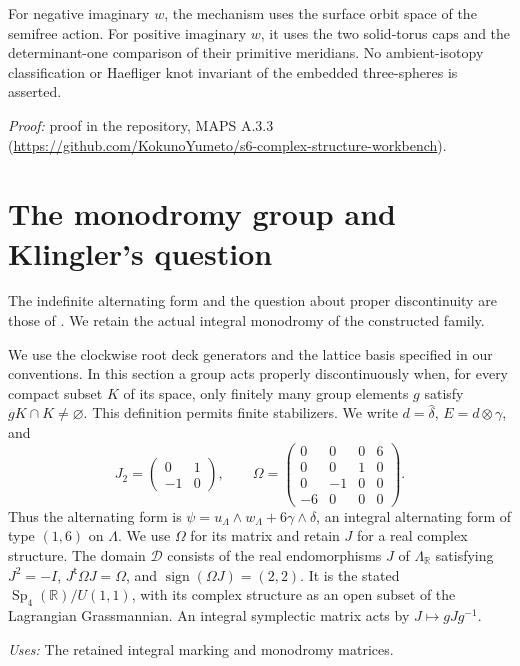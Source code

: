 For negative imaginary $w$, the mechanism uses the surface orbit space of the semifree action. For positive imaginary $w$, it uses the two solid-torus caps and the determinant-one comparison of their primitive meridians. No ambient-isotopy classification or Haefliger knot invariant of the embedded three-spheres is asserted.

\noindent\emph{Proof:} proof in the repository, MAPS A.3.3 (\url{https://github.com/KokunoYumeto/s6-complex-structure-workbench}).

\section{The monodromy group and Klingler's question}
\label{sec:monodromy}
The indefinite alternating form and the question about proper discontinuity
are those of \cite[Remark~8.4]{E26}. We retain the actual integral
monodromy of the constructed family.
\begin{definition}\label{fam:F.setup}
We use the clockwise root deck generators and the lattice basis specified
in our conventions.  In this section a group acts properly discontinuously when, for every
compact subset $K$ of its space, only finitely many group elements $g$ satisfy
$gK\cap K\ne\varnothing$.  This definition permits finite stabilizers.  We
write $d=\widehat\delta$, $E=d\otimes\gamma$, and
\[
 J_2=\begin{pmatrix}0&1\\-1&0\end{pmatrix},\qquad
 \Omega=\begin{pmatrix}
 0&0&0&6\\0&0&1&0\\0&-1&0&0\\-6&0&0&0
 \end{pmatrix}.
\]
Thus the alternating form is
$\psi=u_{\Lambda}\wedge w_{\Lambda}+6\gamma\wedge\delta$, an integral alternating form of
type $(1,6)$ on $\Lambda$.  We use $\Omega$ for its matrix and retain $J$ for
a real complex structure.  The domain $\mathcal D$ consists of the real
endomorphisms $J$ of $\Lambda_{\mathbb R}$ satisfying
$J^2=-I$, $J^{\mathsf t}\Omega J=\Omega$, and
$\operatorname{sign}(\Omega J)=(2,2)$.  It is the stated
$\operatorname{Sp}_4(\mathbb R)/U(1,1)$, with its complex structure as an
open subset of the Lagrangian Grassmannian.  An integral symplectic matrix
acts by $J\mapsto gJg^{-1}$.
\end{definition}
\noindent\emph{Uses:} The retained integral marking and monodromy matrices.\par

